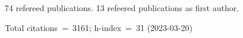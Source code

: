 74 refereed publications. 13 refeered publications as first author.

Total citations~=~3161; h-index~=~31 (2023-03-20)